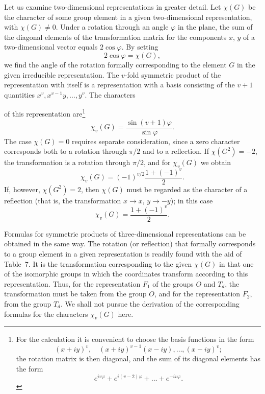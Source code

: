 Let us examine two-dimensional representations in greater detail. Let $\chi(G)$ be the character of some group element in a given two-dimensional representation, with $\chi(G)\ne0$. Under a rotation through an angle $\varphi$ in the plane, the sum of the diagonal elements of the transformation matrix for the components $x$, $y$ of a two-dimensional vector equals $2\cos\varphi$. By setting
\begin{equation}
 2\cos\varphi=\chi(G),
 \tag{101.6}
\end{equation}
we find the angle of the rotation formally corresponding to the element $G$ in the given irreducible representation. The $v$-fold symmetric product of the representation with itself is a representation with a basis consisting of the $v+1$ quantities $x^v,x^{v-1}y,\ldots,y^v$. The characters

of this representation are\footnote{For the calculation it is convenient to choose the basis functions in the form
\[
 (x+iy)^v,\quad (x+iy)^{v-1}(x-iy),\ldots,(x-iy)^v;
\]
the rotation matrix is then diagonal, and the sum of its diagonal elements has the form
\[
 e^{iv\varphi}+e^{i(v-2)\varphi}+\ldots+e^{-iv\varphi}.
\]}
\begin{equation}
 \chi_v(G)=\frac{\sin(v+1)\varphi}{\sin\varphi}.
 \tag{101.7}
\end{equation}
The case $\chi(G)=0$ requires separate consideration, since a zero character corresponds both to a rotation through $\pi/2$ and to a reflection. If $\chi(G^2)=-2$, the transformation is a rotation through $\pi/2$, and for $\chi_v(G)$ we obtain
\begin{equation}
 \chi_v(G)=(-1)^{v/2}\frac{1+(-1)^v}{2}.
 \tag{101.8}
\end{equation}
If, however, $\chi(G^2)=2$, then $\chi(G)$ must be regarded as the character of a reflection (that is, the transformation $x\to x$, $y\to-y$); in this case
\begin{equation}
 \chi_v(G)=\frac{1+(-1)^v}{2}.
 \tag{101.9}
\end{equation}

Formulas for symmetric products of three-dimensional representations can be obtained in the same way. The rotation (or reflection) that formally corresponds to a group element in a given representation is readily found with the aid of Table~7. It is the transformation corresponding to the given $\chi(G)$ in that one of the isomorphic groups in which the coordinates transform according to this representation. Thus, for the representation $F_1$ of the groups $O$ and $T_d$, the transformation must be taken from the group $O$, and for the representation $F_2$, from the group $T_d$. We shall not pursue the derivation of the corresponding formulas for the characters $\chi_v(G)$ here.
